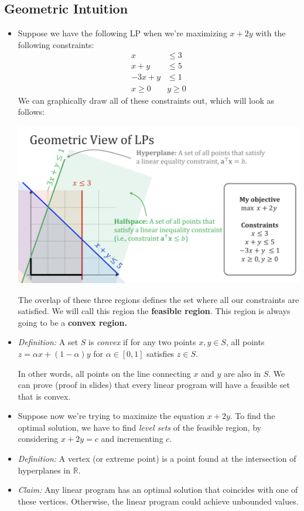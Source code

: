 \subsection{Geometric Intuition}
\begin{itemize}
	\item Suppose we have the following LP when we're maximizing $x + 2y$ with the following constraints:
		\begin{align*}
			x &\le 3\\
			x + y &\le 5\\
			-3x + y &\le 1\\
			x \ge 0 & y \ge 0 
		\end{align*}
		We can graphically draw all of these constraints out, which will look as follows:
		\begin{center}
			\includegraphics[scale=0.5]{LP-geo.png}
		\end{center}
		The overlap of these three regions defines the set where all our constraints are satisfied. We will 
		call this region the \textbf{feasible region}. This region is always going to be a \textbf{convex 
		region.}
	\item \textit{Definition:} A set $S$ is \textit{convex} if for any two points $x, y \in S$, all points 
		$z = \alpha x + (1 - \alpha) y$ for $\alpha \in [0, 1]$ satisfies $z \in S$.
		
		In other words, all points on the line connecting $x$ and $y$ are also in $S$. We can prove (proof 
		in slides) that every linear program will have a feasible set that is convex.
	\item Suppose now we're trying to maximize the equation $x + 2y$. To find the optimal solution, we have to 
		find \textit{level sets} of the feasible region, by considering $x + 2y = c$ and incrementing $c$.  
	\item \textit{Definition:} A vertex (or extreme point) is a point found at the intersection of 
		hyperplanes in \( \mathbb R \). 
	\item \textit{Claim:} Any linear program has an optimal solution that coincides with one of these vertices.
		Otherwise, the linear program could achieve unbounded values.  


\end{itemize}

